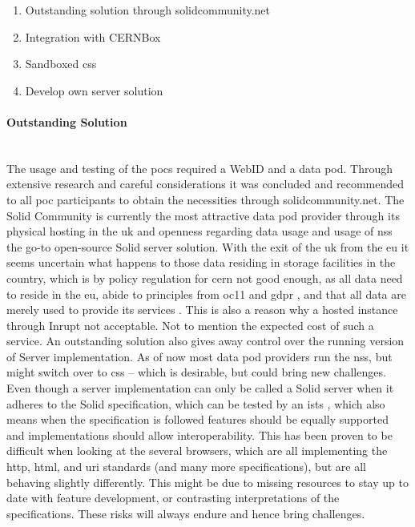 \begin{enumerate}
    \item Outstanding solution through solidcommunity.net
    \item Integration with CERNBox
    \item Sandboxed \gls{css}
    \item Develop own server solution
\end{enumerate}

\paragraph{Outstanding Solution}\mbox{}\\

The usage and testing of the \glspl{poc} required a WebID and a data pod. Through extensive research and careful considerations it was concluded and recommended to all \gls{poc} participants to obtain the necessities through solidcommunity.net. The Solid Community is currently the most attractive data pod provider through its physical hosting in the \gls{uk} and openness regarding data usage and usage of \gls{nss} the go-to open-source Solid server solution. With the exit of the \gls{uk} from the \gls{eu} it seems uncertain what happens to those data residing in storage facilities in the country, which is by policy regulation for \gls{cern} not good enough, as all data need to reside in the \gls{eu}, abide to principles from \gls{oc11} \cite{oc11} and  \gls{gdpr} \cite{gdpr}, and that all data are merely used to provide its services \cite{policy-cern-server}. This is also a reason why a hosted instance through Inrupt \cite{inrupt} not acceptable. Not to mention the expected cost of such a service. An outstanding solution also gives away control over the running version of Server implementation. As of now most data pod providers run the \gls{nss}, but might switch over to \gls{css} -- which is desirable, but could bring new challenges. Even though a server implementation can only be called a Solid server when it adheres to the Solid specification, which can be tested by an \gls{ists} \cite{solid-test-suite}, which also means when the specification is followed features should be equally supported and implementations should allow interoperability. This has been proven to be difficult when looking at the several browsers, which are all implementing the \gls{http}, \gls{html}, and \gls{uri} standards (and many more specifications), but are all behaving slightly differently. This might be due to missing resources to stay up to date with feature development, or contrasting interpretations of the specifications. These risks will always endure and hence bring challenges.
\vspace{0.5cm}
